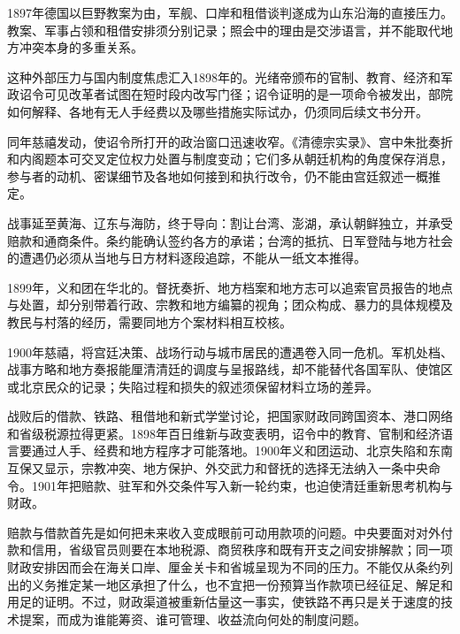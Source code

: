 1897年德国以巨野教案为由，军舰、口岸和租借谈判遂成为山东沿海的直接压力。教案、军事占领和租借安排须分别记录；照会中的理由是交涉语言，并不能取代地方冲突本身的多重关系。

这种外部压力与国内制度焦虑汇入1898年的。光绪帝颁布的官制、教育、经济和军政诏令可见改革者试图在短时段内改写门径；诏令证明的是一项命令被发出，部院如何解释、各地有无人手经费以及哪些措施实际试办，仍须同后续文书分开。

同年慈禧发动，使诏令所打开的政治窗口迅速收窄。《清德宗实录》、宫中朱批奏折和内阁题本可交叉定位权力处置与制度变动；它们多从朝廷机构的角度保存消息，参与者的动机、密谋细节及各地如何接到和执行改令，仍不能由宫廷叙述一概推定。

战事延至黄海、辽东与海防，终于导向：割让台湾、澎湖，承认朝鲜独立，并承受赔款和通商条件。条约能确认签约各方的承诺；台湾的抵抗、日军登陆与地方社会的遭遇仍必须从当地与日方材料逐段追踪，不能从一纸文本推得。

1899年，义和团在华北的。督抚奏折、地方档案和地方志可以追索官员报告的地点与处置，却分别带着行政、宗教和地方编纂的视角；团众构成、暴力的具体规模及教民与村落的经历，需要同地方个案材料相互校核。

1900年慈禧，将宫廷决策、战场行动与城市居民的遭遇卷入同一危机。军机处档、战事方略和地方奏报能厘清清廷的调度与呈报路线，却不能替代各国军队、使馆区或北京民众的记录；失陷过程和损失的叙述须保留材料立场的差异。

战败后的借款、铁路、租借地和新式学堂讨论，把国家财政同跨国资本、港口网络和省级税源拉得更紧。1898年百日维新与政变表明，诏令中的教育、官制和经济语言要通过人手、经费和地方程序才可能落地。1900年义和团运动、北京失陷和东南互保又显示，宗教冲突、地方保护、外交武力和督抚的选择无法纳入一条中央命令。1901年把赔款、驻军和外交条件写入新一轮约束，也迫使清廷重新思考机构与财政。

赔款与借款首先是如何把未来收入变成眼前可动用款项的问题。中央要面对对外付款和信用，省级官员则要在本地税源、商贸秩序和既有开支之间安排解款；同一项财政安排因而会在海关口岸、厘金关卡和省城呈现为不同的压力。不能仅从条约列出的义务推定某一地区承担了什么，也不宜把一份预算当作款项已经征足、解足和用足的证明。不过，财政渠道被重新估量这一事实，使铁路不再只是关于速度的技术提案，而成为谁能筹资、谁可管理、收益流向何处的制度问题。

